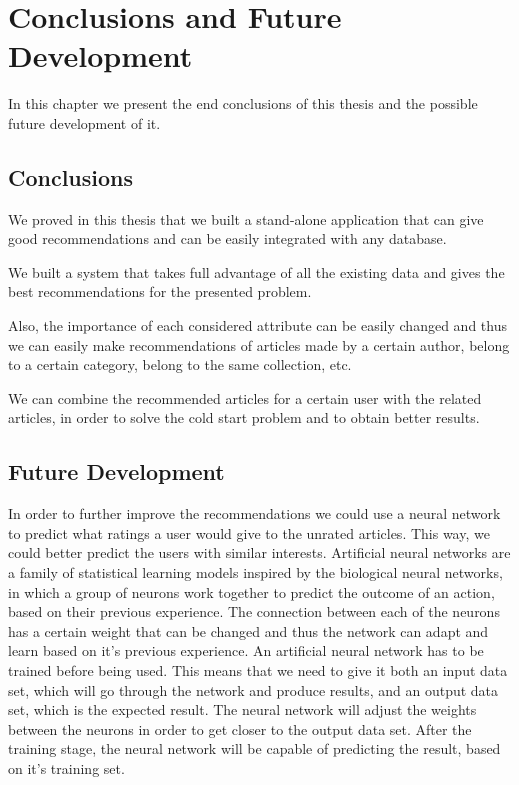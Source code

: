 \chapter{Conclusions and Future Development}
\label{chapter:conclusions-future-development}
In this chapter we present the end conclusions of this thesis and the possible future development of it.

\section{Conclusions} 
\label{sec:conclusions}
We proved in this thesis that we built a stand-alone application that can give good recommendations and can be easily integrated with any database.

We built a system that takes full advantage of all the existing data and gives the best recommendations for the presented problem.

Also, the importance of each considered attribute can be easily changed and thus we can easily make recommendations of articles made by a certain author, belong to a certain category, belong to the same collection, etc. 

We can combine the recommended articles for a certain user with the related articles, in order to solve the cold start problem and to obtain better results.

\section{Future Development} 
\label{sec:future-development}

In order to further improve the recommendations we could use a neural network to predict what ratings a user would give to the unrated articles\cite{netflix-recommender}. This way, we could better predict the users with similar interests.
Artificial neural networks are a family of statistical learning models inspired by the biological neural networks, in which a group of neurons work together to predict the outcome of an action, based on their previous experience. The connection between each of the neurons has a certain weight that can be changed and thus the network can adapt and learn based on it's previous experience. An artificial neural network has to be trained before being used. This means that we need to give it both an input data set, which will go through the network and produce results, and an output data set, which is the expected result. The neural network will adjust the weights between the neurons in order to get closer to the output data set. After the training stage, the neural network will be capable of predicting the result, based on it's training set.

